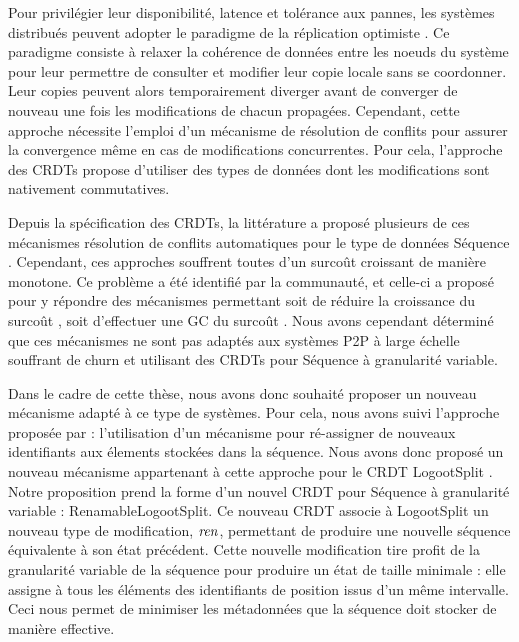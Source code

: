 Pour privilégier leur disponibilité, latence et tolérance aux pannes, les systèmes distribués peuvent adopter le paradigme de la réplication optimiste \cite{2005-optimistic-replication-saito}.
Ce paradigme consiste à relaxer la cohérence de données entre les noeuds du système pour leur permettre de consulter et modifier leur copie locale sans se coordonner.
Leur copies peuvent alors temporairement diverger avant de converger de nouveau une fois les modifications de chacun propagées.
Cependant, cette approche nécessite l'emploi d'un mécanisme de résolution de conflits pour assurer la convergence même en cas de modifications concurrentes.
Pour cela, l'approche des \acp{CRDT} \cite{2007-crdt-shapiro,shapiro_2011_crdt} propose d'utiliser des types de données dont les modifications sont nativement commutatives.

Depuis la spécification des \acp{CRDT}, la littérature a proposé plusieurs de ces mécanismes résolution de conflits automatiques pour le type de données Séquence \cite{2006-woot-oster,ROH2011354,2009-treedoc-preguica,2009-logoot-weiss}.
Cependant, ces approches souffrent toutes d'un surcoût croissant de manière monotone.
Ce problème a été identifié par la communauté, et celle-ci a proposé pour y répondre des mécanismes permettant soit de réduire la croissance du surcoût \cite{lseq2013,lseq2017}, soit d'effectuer une \ac{GC} du surcoût \cite{ROH2011354,letia:hal-01248270,zawirski:hal-01248197}.
Nous avons cependant déterminé que ces mécanismes ne sont pas adaptés aux systèmes \ac{P2P} à large échelle souffrant de churn et utilisant des \acp{CRDT} pour Séquence à granularité variable.

Dans le cadre de cette thèse, nous avons donc souhaité proposer un nouveau mécanisme adapté à ce type de systèmes.
Pour cela, nous avons suivi l'approche proposée par \cite{letia:hal-01248270,zawirski:hal-01248197} : l'utilisation d'un mécanisme pour ré-assigner de nouveaux identifiants aux élements stockées dans la séquence.
Nous avons donc proposé un nouveau mécanisme appartenant à cette approche pour le \ac{CRDT} LogootSplit \cite{2013-logootsplit}.\\

Notre proposition prend la forme d'un nouvel \ac{CRDT} pour Séquence à granularité variable : RenamableLogootSplit.
Ce nouveau \ac{CRDT} associe à LogootSplit un nouveau type de modification, $\mathit{ren}$, permettant de produire une nouvelle séquence équivalente à son état précédent.
Cette nouvelle modification tire profit de la granularité variable de la séquence pour produire un état de taille minimale : elle assigne à tous les éléments des identifiants de position issus d'un même intervalle.
Ceci nous permet de minimiser les métadonnées que la séquence doit stocker de manière effective.

